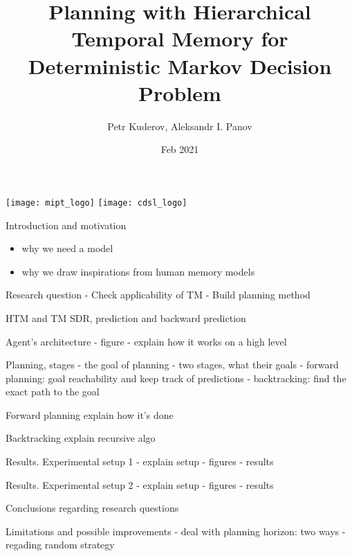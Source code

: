 \documentclass[default]{beamer}
\begin{document}
\title[]{
	Planning with Hierarchical Temporal Memory for Deterministic Markov Decision Problem
}
\author[Petr Kuderov]{
    Petr Kuderov, Aleksandr I. Panov
}
\date[]{Feb 2021}
	
\begin{frame}
	\titlepage
	\centering
	\texttt{[image: mipt\_logo]} \hspace{10pt}
	\texttt{[image: cdsl\_logo]} \hspace{10pt}
\end{frame}

\begin{frame}{Introduction and motivation}
	\begin{itemize}
		\item why we need a model
		\item why we draw inspirations from human memory models
	\end{itemize}
\end{frame}

\begin{frame}{Research question}
	- Check applicability of TM
  - Build planning method
\end{frame}

\begin{frame}{HTM and TM}
	SDR, prediction and backward prediction	
\end{frame}

\begin{frame}{Agent's architecture}
	- figure
	- explain how it works on a high level	
\end{frame}

\begin{frame}{Planning, stages}
	- the goal of planning
	- two stages, what their goals
	- forward planning: goal reachability and keep track of predictions
	- backtracking: find the exact path to the goal
\end{frame}

\begin{frame}{Forward planning}
	explain how it's done
\end{frame}

\begin{frame}{Backtracking}
	explain recursive algo
\end{frame}

\begin{frame}{Results. Experimental setup 1}
	- explain setup
	- figures
	- results	
\end{frame}

\begin{frame}{Results. Experimental setup 2}
	- explain setup
	- figures
	- results	
\end{frame}

\begin{frame}{Conclusions}
	regarding research questions
\end{frame}

\begin{frame}{Limitations and possible improvements}
	- deal with planning horizon: two ways
	- regading random strategy	
\end{frame}
\end{document}
